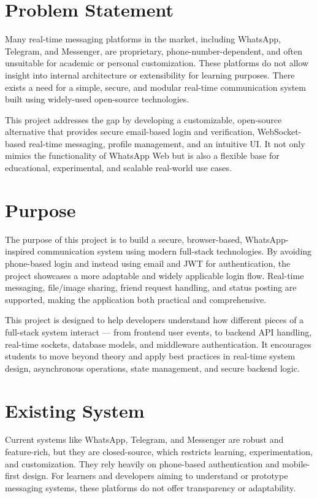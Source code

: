 \documentclass[12pt,a4paper]{report}
\begin{document}
\section{Problem Statement}
Many real-time messaging platforms in the market, including WhatsApp, Telegram, and Messenger, are proprietary, phone-number-dependent, and often unsuitable for academic or personal customization. These platforms do not allow insight into internal architecture or extensibility for learning purposes. There exists a need for a simple, secure, and modular real-time communication system built using widely-used open-source technologies.

This project addresses the gap by developing a customizable, open-source alternative that provides secure email-based login and verification, WebSocket-based real-time messaging, profile management, and an intuitive UI. It not only mimics the functionality of WhatsApp Web but is also a flexible base for educational, experimental, and scalable real-world use cases.

\section{Purpose}
The purpose of this project is to build a secure, browser-based, WhatsApp-inspired communication system using modern full-stack technologies. By avoiding phone-based login and instead using email and JWT for authentication, the project showcases a more adaptable and widely applicable login flow. Real-time messaging, file/image sharing, friend request handling, and status posting are supported, making the application both practical and comprehensive.

This project is designed to help developers understand how different pieces of a full-stack system interact — from frontend user events, to backend API handling, real-time sockets, database models, and middleware authentication. It encourages students to move beyond theory and apply best practices in real-time system design, asynchronous operations, state management, and secure backend logic.

\section{Existing System}
Current systems like WhatsApp, Telegram, and Messenger are robust and feature-rich, but they are closed-source, which restricts learning, experimentation, and customization. They rely heavily on phone-based authentication and mobile-first design. For learners and developers aiming to understand or prototype messaging systems, these platforms do not offer transparency or adaptability.
\end{document}
